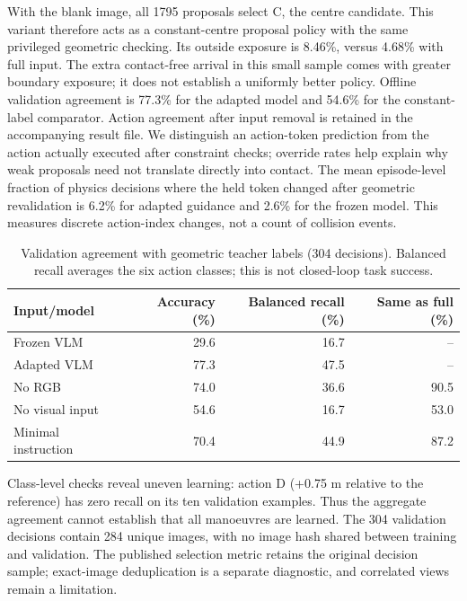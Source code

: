 \documentclass[10pt,a4paper]{article}
\begin{document}
With the blank image, all 1795 proposals select C, the centre candidate. This variant therefore acts as a constant-centre proposal policy with the same privileged geometric checking. Its outside exposure is 8.46\%, versus 4.68\% with full input. The extra contact-free arrival in this small sample comes with greater boundary exposure; it does not establish a uniformly better policy.
Offline validation agreement is 77.3\% for the adapted model and 54.6\% for the constant-label comparator. Action agreement after input removal is retained in the accompanying result file. We distinguish an action-token prediction from the action actually executed after constraint checks; override rates help explain why weak proposals need not translate directly into contact.
The mean episode-level fraction of physics decisions where the held token changed after geometric revalidation is 6.2\% for adapted guidance and 2.6\% for the frozen model. This measures discrete action-index changes, not a count of collision events.
\begin{table}[tb]\centering\small\caption{Validation agreement with geometric teacher labels (304 decisions). Balanced recall averages the six action classes; this is not closed-loop task success.}\begin{tabular}{lrrr}\toprule
Input/model & Accuracy (\%) & Balanced recall (\%) & Same as full (\%) \\ \midrule
Frozen VLM & 29.6 & 16.7 & -- \\
Adapted VLM & 77.3 & 47.5 & -- \\
No RGB & 74.0 & 36.6 & 90.5 \\
No visual input & 54.6 & 16.7 & 53.0 \\
Minimal instruction & 70.4 & 44.9 & 87.2 \\
\bottomrule\end{tabular}\end{table}
Class-level checks reveal uneven learning: action D (+0.75 m relative to the reference) has zero recall on its ten validation examples. Thus the aggregate agreement cannot establish that all manoeuvres are learned. The 304 validation decisions contain 284 unique images, with no image hash shared between training and validation. The published selection metric retains the original decision sample; exact-image deduplication is a separate diagnostic, and correlated views remain a limitation.
\end{document}
